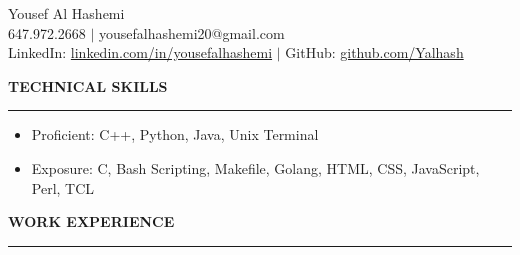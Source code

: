 \documentclass[12pt]{article}
\newcommand{\sectionRule}{\textcolor{gray}{\rule{7.27in}{0.02cm}}}
\newcommand{\sectionTxt}[1]{\noindent\textbf{#1}\\}
\begin{document}
    \begin{center}
        {\huge Yousef Al Hashemi}\\
        {\normalsize 647.972.2668 $|$ yousefalhashemi20@gmail.com}\\
        {\normalsize LinkedIn: \href{https://www.linkedin.com/in/yousefalhashemi}{linkedin.com/in/yousefalhashemi} $|$ GitHub: \href{https://github.com/Yalhash}{github.com/Yalhash}}\\
    \end{center}
    \sectionTxt{TECHNICAL SKILLS}
    \sectionRule
    \begin{small}
        \begin{itemize}
            \itemsep0em 
            \item Proficient: {\color{textGray}C++, Python, Java, Unix Terminal}
            \item Exposure: {\color{textGray}C, Bash Scripting, Makefile, Golang, HTML, CSS, JavaScript, Perl, TCL}
        \end{itemize}
    \end{small}
    \sectionTxt{WORK EXPERIENCE}
    \sectionRule
\end{document}
